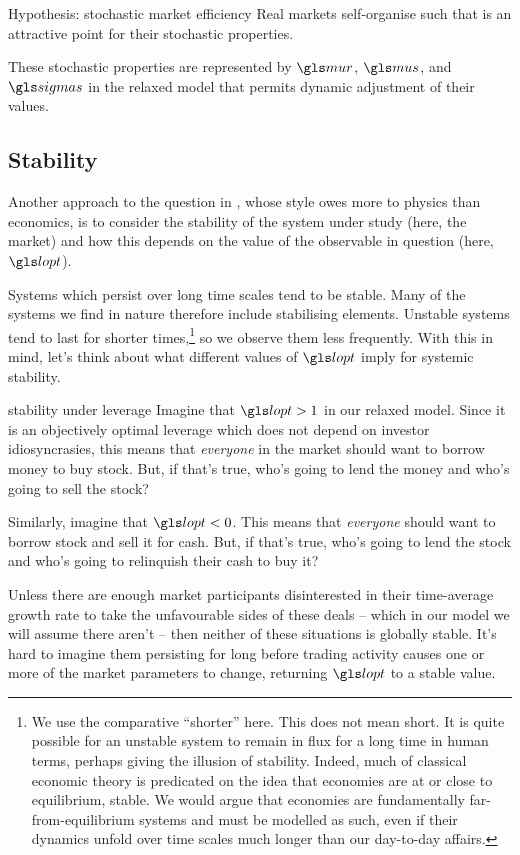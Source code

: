 \begin{keypts}{Hypothesis: stochastic market efficiency}
Real markets self-organise such that
\be
{}
\ee
is an attractive point for their stochastic properties.
\end{keypts}
These stochastic properties are represented by $\mur$, $\mus$, and $\sigmas$ in the relaxed model that permits dynamic adjustment of their values. %

\subsection{Stability}
Another approach to the question in , whose style owes more to physics than economics, is to consider the stability of the system under study (here, the market) and how this depends on the value of the observable in question (here, $\lopt$). 

Systems which persist over long time scales tend to be stable. Many of the systems we find in nature therefore include stabilising elements. Unstable systems tend to last for shorter times,\footnote{We use the comparative ``shorter'' here. This does not mean short. It is quite possible for an unstable system to remain in flux for a long time in human terms, perhaps giving the illusion of stability. Indeed, much of classical economic theory is predicated on the idea that economies are at or close to equilibrium, \ie stable. We would argue that economies are fundamentally far-from-equilibrium systems and must be modelled as such, even if their dynamics unfold over time scales much longer than our day-to-day affairs.} so we observe them less frequently. With this in mind, let's think about what different values of $\lopt$ imply for systemic stability.

\begin{thoughtex}{stability under leverage}
Imagine that $\lopt>1$ in our relaxed model. Since it is an objectively optimal leverage which does not depend on investor idiosyncrasies, this means that \textit{everyone} in the market should want to borrow money to buy stock. But, if that's true, who's going to lend the money and who's going to sell the stock?

Similarly, imagine that $\lopt<0$. This means that \textit{everyone} should want to borrow stock and sell it for cash. But, if that's true, who's going to lend the stock and who's going to relinquish their cash to buy it?

Unless there are enough market participants disinterested in their time-average growth rate to take the unfavourable sides of these deals -- which in our model we will assume there aren't -- then neither of these situations is globally stable. It's hard to imagine them persisting for long before trading activity causes one or more of the market parameters to change, returning $\lopt$ to a stable value.
\end{thoughtex}

